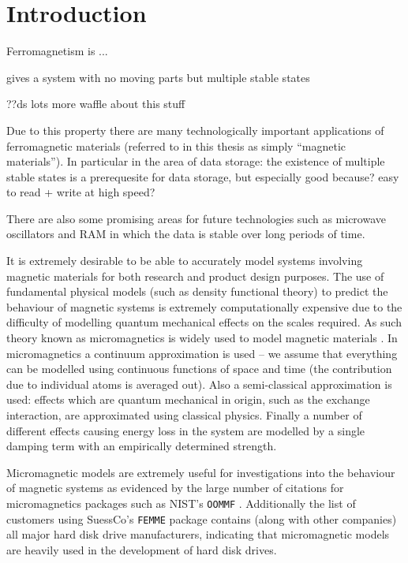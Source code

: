 
\chapter{Introduction}
\label{sec:introduction}

Ferromagnetism is ...

gives a system with no moving parts but multiple stable states


??ds lots more waffle about this stuff

Due to this property there are many technologically important applications of ferromagnetic materials (referred to in this thesis as simply ``magnetic materials'').
In particular in the area of data storage: the existence of multiple stable states is a prerequesite for data storage, but especially good because? easy to read + write at high speed?

There are also some promising areas for future technologies such as microwave oscillators and RAM in which the data is stable over long periods of time.

It is extremely desirable to be able to accurately model systems involving magnetic materials for both research and product design purposes.
The use of fundamental physical models (such as density functional theory) to predict the behaviour of magnetic systems is extremely computationally expensive due to the difficulty of modelling quantum mechanical effects on the scales required.
As such theory known as micromagnetics is widely used to model magnetic materials \cite{Coey2010} \cite{Kronmuller2003}.
In micromagnetics a continuum approximation is used -- we assume that everything can be modelled using continuous functions of space and time (\ie the contribution due to individual atoms is averaged out).
Also a semi-classical approximation is used: effects which are quantum mechanical in origin, such as the exchange interaction, are approximated using classical physics.
Finally a number of different effects causing energy loss in the system are modelled by a single damping term with an empirically determined strength.

Micromagnetic models are extremely useful for investigations into the behaviour of magnetic systems as evidenced by the large number of citations for micromagnetics packages such as NIST's \texttt{OOMMF} \cite{oommf-website}.
Additionally the list of customers using SuessCo's \texttt{FEMME} package \cite{suessco-website} contains (along with other companies) all major hard disk drive manufacturers, indicating that micromagnetic models are heavily used in the development of hard disk drives.

